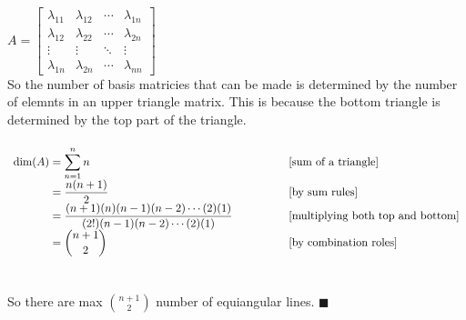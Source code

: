 \documentclass[12pt]{article}
\renewcommand{\qed}{\hfill$\blacksquare$}
\begin{document}
$A =\begin{bmatrix}
	\lambda_{11} & \lambda_{12} & \cdots & \lambda_{1n} \\
	\lambda_{12} & \lambda_{22} & \cdots & \lambda_{2n} \\
	\vdots       & \vdots       & \ddots & \vdots       \\
	\lambda_{1n} & \lambda_{2n} & \cdots & \lambda_{nn}
\end{bmatrix}$\\
	So the number of basis matricies that can be made is determined by the number of elemnts in an upper triangle matrix. This is because the bottom triangle is determined by the top part of the triangle.
	\\\\
$\begin{array}{r@{}>{\displaystyle}ll}
	\text{dim}(A) & {}= \sum_{n = 1}^{n}n                                                               & [\text{sum of a triangle}]               \\
	              & {}= \frac{n(n+1)}{2}                                                                & [\text{by sum rules}]                    \\
	              & {}= \frac{(n+1)(n)(n-1)(n-2)\cdots(2)(1)}{(2!)(n-1)(n-2)\cdots(2)(1)} \qquad \qquad & [\text{multiplying both top and bottom}] \\
	              & {}= \binom{n+1}{2}                                                                  & [\text{by combination roles}]
\end{array}$
	\\\\\\
	So there are max $\displaystyle \binom{n+1}{2}$ number of equiangular lines. \qed
\end{document}
